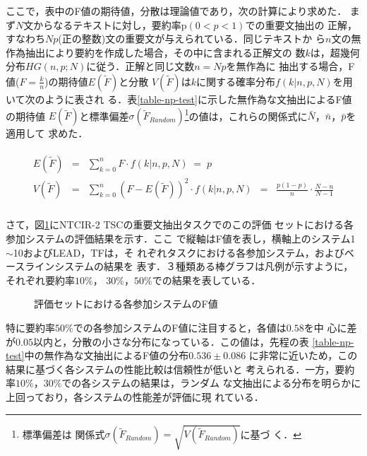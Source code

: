 ここで，表中のF値の期待値，分散は理論値であり，次の計算により求めた．
まず$N$文からなるテキストに対し，要約率p$(0 < p < 1)$での重要文抽出の
正解，すなわち$Np$(正の整数)文の重要文が与えられている．同じテキストか
ら$n$文の無作為抽出により要約を作成した場合，その中に含まれる正解文の
数$k$は，超幾何分布$HG(n,p;N)$に従う．正解と同じ文数$n= Np$を無作為に
抽出する場合，F値($F = \frac{k}{n}$)の期待値$E(\tilde F)$と分散
$V(\tilde F)$は$k$に関する確率分布$f(k|n,p,N)$を用いて次のように表され
る．表\ref{table-np-test}に示した無作為な文抽出によるF値の期待値
$E(\tilde F)$と標準偏差$\sigma(\tilde F_{Random})$\footnote{標準偏差は
関係式$\sigma(\tilde F_{Random}) = \sqrt{V(\tilde F_{Random})}$に基づ
く．}の値は，これらの関係式に$\bar{N}$，$\bar{n}$，$\bar{p}$を適用して
求めた．

\begin{eqnarray}
\begin{array}{lllll}
E(\tilde F) & = & \sum_{k=0}^{n} F \cdot f(k|n,p,N) \; = \;p &&\\
V(\tilde F) & = & \sum_{k=0}^{n} \left( F - E(\tilde F) \right)^2 \cdot
f(k|n,p,N) & = & \frac{p(1 - p)}{n} \cdot \frac{N-n}{N-1}\\
\end{array}
\end{eqnarray}

さて，図\ref{NTCIR-results}にNTCIR-2 TSCの重要文抽出タスクでのこの評価
セットにおける各参加システムの評価結果を示す\cite{T.Fukusima.01}．ここ
で縦軸はF値を表し，横軸上のシステム1$\sim$10およびLEAD，TFは，そ
れぞれタスクにおける各参加システム，およびベースラインシステムの結果を
表す．３種類ある棒グラフは凡例が示すように，それぞれ要約率$10\%$，
$30\%$，$50\%$での結果を表している．

\begin{figure}
\begin{center}
\caption{評価セットにおける各参加システムのF値}
\label{NTCIR-results}
\end{center}
\end{figure}

特に要約率$50\%$での各参加システムのF値に注目すると，各値は$0.58$を中
心に差が$0.05$以内と，分散の小さな分布になっている．この値は，先程の表
\ref{table-np-test}中の無作為な文抽出によるF値の分布$0.536 \pm 0.086$
に非常に近いため，この結果に基づく各システムの性能比較は信頼性が低いと
考えられる．一方，要約率$10\%$，$30\%$での各システムの結果は，ランダム
な文抽出による分布を明らかに上回っており，各システムの性能差が評価に現
れている．

